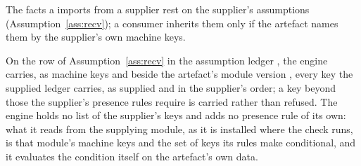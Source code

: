 
The facts a  imports from a supplier rest on the
supplier's assumptions (Assumption~\ref{ass:recv}); a consumer inherits them
only if the artefact names them by the supplier's own machine keys.

\begin{requirement}\label{req:supplier-ledger-pass-through}
On the row of Assumption~\ref{ass:recv} in the assumption ledger
, the engine carries, as machine keys and beside the
artefact's module version , every key the supplied
ledger carries, as supplied and in the supplier's order; a key beyond those
the supplier's presence rules require is carried rather than refused. The
engine holds no list of the supplier's keys and adds no presence rule of its
own: what it reads from the supplying module, as it is installed where the
check runs, is that module's machine keys and the set of keys its rules make
conditional, and it evaluates the condition itself on the artefact's own
data.
\end{requirement}
